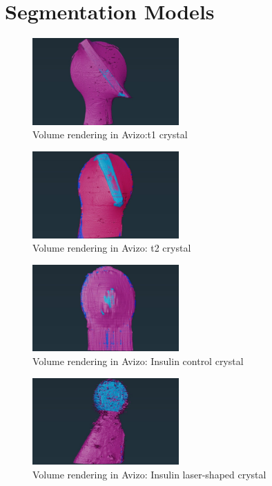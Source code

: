 \printbibliography
\newpage

\appendix
\noindent
\twocolumn
\section{Segmentation Models}

\begin{figure}[h]
	\includegraphics[width=0.5\textwidth]{images/avizo_flats/tlys_9.jpg}
	\caption{Volume rendering in Avizo:\ac{t1} crystal}
 \label{tlys9}
\end{figure}
\begin{figure}
	\includegraphics[width=0.5\textwidth]{images/avizo_flats/tlys2.jpg}
	\caption{Volume rendering in Avizo: \ac{t2} crystal}
 \label{tlys2}
\end{figure}



\begin{figure}
	\includegraphics[width=0.5\textwidth]{images/avizo_flats/ins_con.jpg}
	\caption{Volume rendering in Avizo: Insulin control crystal}
 \label{ins_control}
\end{figure}
\begin{figure}
	\includegraphics[width=0.5\textwidth]{images/avizo_flats/ins_ls.jpg}
	\caption{Volume rendering in Avizo: Insulin laser-shaped crystal}
 \label{ins_lasershaped}
\end{figure}

